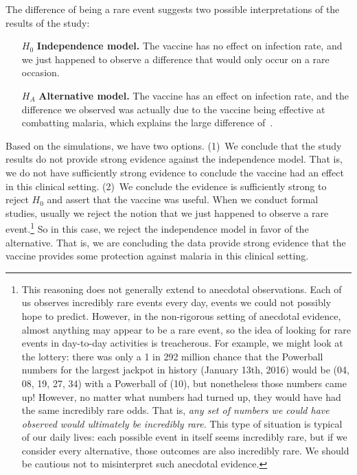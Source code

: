 The difference of \malariaIRDiffPerc{} being
a rare event suggests two possible interpretations
of the results of the study:
\begin{itemize}
  \setlength{\itemsep}{0mm}
  \item[$H_0$] \textbf{Independence model.}
      The vaccine has no effect on infection rate,
      and we just happened to observe a difference
      that would only occur on a rare occasion.
  \item[$H_A$] \textbf{Alternative model.}
      The vaccine has an effect on infection rate,
      and the difference we observed was actually due to
      the vaccine being effective at combatting malaria,
      which explains the large difference
      of~\malariaIRDiffPerc{}.
\end{itemize}
Based on the simulations, we have two options.
(1)~We conclude that the study results do not provide
strong evidence against the independence model.
That is, we do not have sufficiently strong evidence
to conclude the vaccine had an effect in this
clinical setting.
(2)~We conclude the evidence is sufficiently strong
to reject $H_0$ and assert that the vaccine was useful.
When we conduct formal studies, usually we reject the
notion that we just happened to observe a rare
event.\footnote{This reasoning does not generally extend
    to anecdotal observations.
    Each of us observes incredibly rare events every day,
    events we could not possibly hope to predict.
    However, in the non-rigorous setting of anecdotal
    evidence, almost anything may appear to be a rare event,
    so the idea of looking for rare events in day-to-day
    activities is treacherous.
    For example, we might look at the lottery:
    there was only a 1 in 292 million chance that the
    Powerball numbers for the largest jackpot in history
    (January 13th, 2016) would be (04, 08, 19, 27, 34)
    with a Powerball of (10),
    but nonetheless those numbers came up!
    However, no matter what numbers had turned up,
    they would have had the same incredibly rare odds.
    That is, \emph{any set of numbers we could have
    observed would ultimately be incredibly rare}.
    This type of situation is typical of our daily lives:
    each possible event in itself seems incredibly rare,
    but if we consider every alternative, those outcomes
    are also incredibly rare.
    We should be cautious not to misinterpret such
    anecdotal evidence.}
So in this case, we reject the independence model in favor
of the alternative.
That is, we are concluding the data provide strong evidence
that the vaccine provides some protection against malaria
in this clinical setting.

